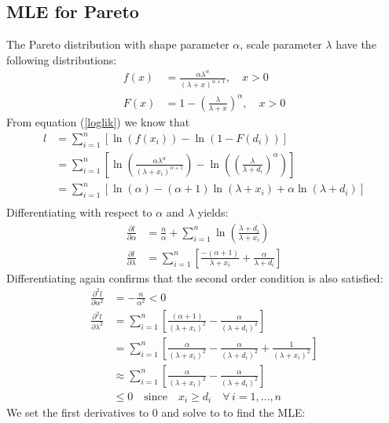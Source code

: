 \documentclass{article}
\begin{document}
	\subsection{MLE for Pareto}
	The Pareto distribution with shape parameter $ \alpha $, scale parameter $ \lambda $ have the following distributions:
	\begin{align*}
	f(x) &= \frac{\alpha \lambda^\alpha}{(\lambda+x)^{\alpha + 1}}, \quad x > 0\\
	F(x) &= 1-\left(\frac{\lambda}{\lambda + x}\right)^\alpha, \quad x > 0
	\end{align*}
	From equation (\ref{loglik}) we know that 
	\begin{align*}
		l&=\sum_{i=1}^{n}\left[\ln(f(x_i)) - \ln(1-F(d_i))\right]\\
		&=\sum_{i=1}^{n}\left[\ln\left(\frac{\alpha\lambda^\alpha}{(\lambda + x_i)^{\alpha+1}}\right) - \ln\left(\left(\frac{\lambda}{\lambda + d_i}\right)^\alpha\right)\right]\\
		&=\sum_{i=1}^{n}\left[\ln(\alpha) - (\alpha + 1)\ln(\lambda + x_i) + \alpha\ln(\lambda+d_i)\right]\\
	\end{align*}
	Differentiating with respect to $\alpha$ and $\lambda$ yields:
	\begin{align}
		\frac{\partial l}{\partial\alpha}&=\frac{n}{\alpha} +\sum_{i=1}^{n}\ln\left(\frac{\lambda + d_i}{\lambda+x_i}\right)\\
		\frac{\partial l}{\partial\lambda}&=\sum_{i=1}^{n}\left[\frac{-(\alpha+1)}{\lambda+x_i}+\frac{\alpha}{\lambda+d_i}\right]
	\end{align}
	Differentiating again confirms that the second order condition is also satisfied:
	\begin{align*}
		\frac{\partial^2 l}{\partial \alpha^2} & = -\frac{n}{\alpha^2}<0\\
		\frac{\partial^2 l}{\partial \lambda^2} & = \sum_{i=1}^{n}\left[\frac{(\alpha+1)}{(\lambda+x_i)^2}-\frac{\alpha}{(\lambda+d_i)^2}\right]\\
		&=\sum_{i=1}^{n}\left[\frac{\alpha}{(\lambda+x_i)^2}-\frac{\alpha}{(\lambda+d_i)^2 }+\frac{1}{(\lambda+x_i)^2}\right]\\
		&\approx \sum_{i=1}^{n}\left[\frac{\alpha}{(\lambda+x_i)^2}-\frac{\alpha}{(\lambda+d_i)^2 }\right]\\
		&\leq 0 \quad \text{since} \quad x_i \geq d_i \quad \forall \, i = 1,\ldots ,n
	\end{align*}
	We set the first derivatives to $0$ and solve to to find the MLE:
\end{document}
